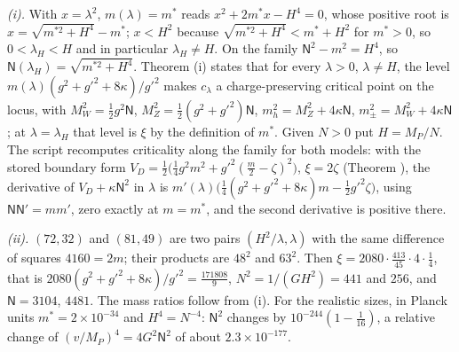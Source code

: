 \emph{(i).} With $x = \lambda^{2}$, $m(\lambda) = m^{*}$ reads $x^{2} + 2m^{*}x - H^{4} = 0$, whose positive root is $x = \sqrt{m^{*2} + H^{4}} - m^{*}$; $x < H^{2}$ because $\sqrt{m^{*2} + H^{4}} < m^{*} + H^{2}$ for $m^{*} > 0$, so $0 < \lambda_{H} < H$ and in particular $\lambda_{H} \neq H$. On the family $\mathsf{N}^{2} - m^{2} = H^{4}$, so $\mathsf{N}(\lambda_{H}) = \sqrt{m^{*2} + H^{4}}$. Theorem (i) states that for every $\lambda > 0$, $\lambda \neq H$, the level $m(\lambda)(g^{2} + g'^{2} + 8\kappa)/g'^{2}$ makes $c_{\lambda}$ a charge-preserving critical point on the locus, with $M_{W}^{2} = \tfrac12 g^{2}\mathsf{N}$, $M_{Z}^{2} = \tfrac12(g^{2} + g'^{2})\mathsf{N}$, $m_{h}^{2} = M_{Z}^{2} + 4\kappa\mathsf{N}$, $m_{\pm}^{2} = M_{W}^{2} + 4\kappa\mathsf{N}$; at $\lambda = \lambda_{H}$ that level is $\xi$ by the definition of $m^{*}$. Given $N > 0$ put $H = M_{P}/N$. The script recomputes criticality along the family for both models: with the stored boundary form $V_{D} = \tfrac12\bigl(\tfrac14 g^{2}m^{2} + g'^{2}(\tfrac{m}{2} - \zeta)^{2}\bigr)$, $\xi = 2\zeta$ (Theorem ), the derivative of $V_{D} + \kappa\mathsf{N}^{2}$ in $\lambda$ is $m'(\lambda)\bigl(\tfrac14(g^{2} + g'^{2} + 8\kappa)m - \tfrac12 g'^{2}\zeta\bigr)$, using $\mathsf{N}\mathsf{N}' = mm'$, zero exactly at $m = m^{*}$, and the second derivative is positive there.

\emph{(ii).} $(72, 32)$ and $(81, 49)$ are two pairs $(H^{2}/\lambda, \lambda)$ with the same difference of squares $4160 = 2m$; their products are $48^{2}$ and $63^{2}$. Then $\xi = 2080 \cdot \tfrac{413}{45} \cdot 4 \cdot \tfrac14$, that is $2080(g^{2} + g'^{2} + 8\kappa)/g'^{2} = \tfrac{171808}{9}$, $N^{2} = 1/(GH^{2}) = 441$ and $256$, and $\mathsf{N} = 3104$, $4481$. The mass ratios follow from (i). For the realistic sizes, in Planck units $m^{*} = 2 \times 10^{-34}$ and $H^{4} = N^{-4}$: $\mathsf{N}^{2}$ changes by $10^{-244}(1 - \tfrac{1}{16})$, a relative change of $(v/M_{P})^{4} = 4G^{2}\mathsf{N}^{2}$ of about $2.3 \times 10^{-177}$.


